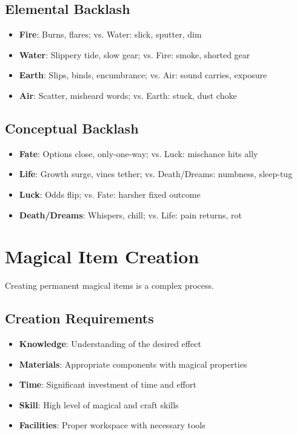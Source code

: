 \subsection*{Elemental Backlash}
\begin{itemize}
\item \textbf{Fire}: Burns, flares; vs. Water: slick, sputter, dim
\item \textbf{Water}: Slippery tide, slow gear; vs. Fire: smoke, shorted gear
\item \textbf{Earth}: Slips, binds, encumbrance; vs. Air: sound carries, exposure
\item \textbf{Air}: Scatter, misheard words; vs. Earth: stuck, dust choke
\end{itemize}

\subsection*{Conceptual Backlash}
\begin{itemize}
\item \textbf{Fate}: Options close, only-one-way; vs. Luck: mischance hits ally
\item \textbf{Life}: Growth surge, vines tether; vs. Death/Dreams: numbness, sleep-tug
\item \textbf{Luck}: Odds flip; vs. Fate: harsher fixed outcome
\item \textbf{Death/Dreams}: Whispers, chill; vs. Life: pain returns, rot
\end{itemize}

\section{Magical Item Creation} 

Creating permanent magical items is a complex process.

\subsection*{Creation Requirements}
\begin{itemize}
\item \textbf{Knowledge}: Understanding of the desired effect
\item \textbf{Materials}: Appropriate components with magical properties
\item \textbf{Time}: Significant investment of time and effort
\item \textbf{Skill}: High level of magical and craft skills
\item \textbf{Facilities}: Proper workspace with necessary tools
\end{itemize}


